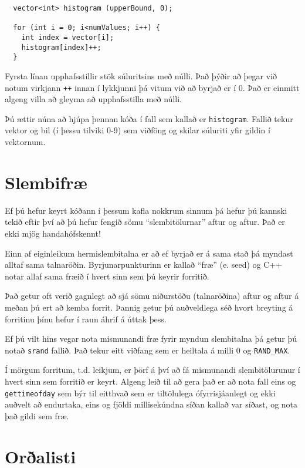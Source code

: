 \begin{verbatim}
  vector<int> histogram (upperBound, 0);

  for (int i = 0; i<numValues; i++) {
    int index = vector[i];
    histogram[index]++;
  }
\end{verbatim}
%
Fyrsta línan upphafsstillir stök súluritsins með núlli.
Það þýðir að þegar við notum virkjann {\tt ++} innan í lykkjunni þá vitum við að byrjað er í 0.
Það er einmitt algeng villa að gleyma að upphafsstilla með núlli.

Þú ættir núna að hjúpa þennan kóða í fall sem kallað er {\tt histogram}.
Fallið tekur vektor og bil (í þessu tilviki 0-9) sem viðföng og skilar súluriti yfir gildin í vektornum.

\section{Slembifræ}

Ef þú hefur keyrt kóðann í þessum kafla nokkrum sinnum þá hefur þú kannski tekið eftir því að þú hefur fengið sömu ``slembitölurnar'' aftur og aftur.
Það er ekki mjög handahófskennt!

Einn af eiginleikum hermislembitalna er að ef byrjað er á sama stað þá myndast alltaf sama talnaröðin.
Byrjunarpunkturinn er kallað ``fræ'' (e. seed) og C++ notar allaf sama fræið í hvert sinn sem þú keyrir forritið.

Það getur oft verið gagnlegt að sjá sömu niðurstöðu (talnaröðina) aftur og aftur á meðan þú ert að kemba forrit.
Þannig getur þú auðveldlega séð hvort breyting á forritinu þínu hefur í raun áhrif á úttak þess.

Ef þú vilt hins vegar nota mismunandi fræ fyrir myndun slembitalna þá getur þú notað {\tt srand} fallið.
Það tekur eitt viðfang sem er heiltala á milli 0 og {\tt RAND\_MAX}.

Í mörgum forritum, t.d. leikjum, er þörf á því að fá mismunandi slembitölurunur í hvert sinn sem forritið er keyrt.
Algeng leið til að gera það er að nota fall eins og {\tt gettimeofday} sem býr til eitthvað sem er tiltölulega ófyrrisjáanlegt og ekki auðvelt að endurtaka,
eins og fjöldi millisekúndna síðan kallað var síðast, og nota það gildi sem fræ.

\section{Orðalisti}

